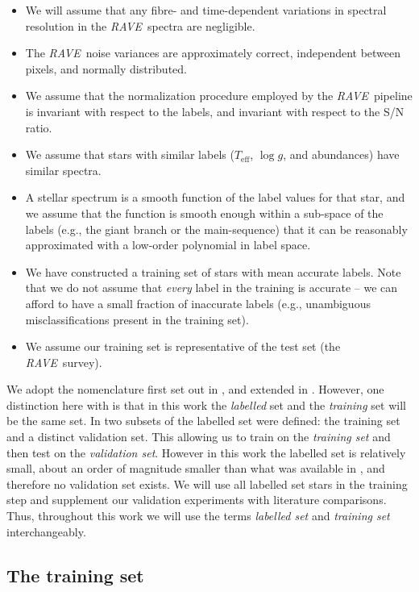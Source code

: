 \documentclass[preprint,trackchanges]{aastex}
\newcommand{\acronym}[1]{{\small{#1}}}
\newcommand{\project}[1]{\textsl{#1}}
\newcommand{\rave}{\project{\acronym{RAVE}}}
\newcommand{\teff}{T_{\mathrm{eff}}}
\newcommand{\logg}{\log g}
\begin{document}
\begin{itemize}
\item We will assume that any fibre- and time-dependent variations in spectral
resolution in the \rave\ spectra are negligible.
\item The \rave\ noise variances are approximately correct, independent between
pixels, and normally distributed.
\item We assume that the normalization procedure employed by the \rave\ pipeline
is invariant with respect to the labels, and invariant with respect to the S/N
ratio.
\item We assume that stars with similar labels ($\teff$, $\logg$, and abundances)
have similar spectra.
\item A stellar spectrum is a smooth function of the label values for that star,
and we assume that the function is smooth enough within a sub-space of the labels
(e.g., the giant branch or the main-sequence) that it can be reasonably approximated 
with a low-order polynomial in label space.
\item We have constructed a training set of stars with mean accurate labels.  Note
that we do not assume that \emph{every} label in the training is accurate -- we can
afford to have a small fraction of inaccurate labels (e.g., unambiguous misclassifications
present in the training set).
\item We assume our training set is representative of the test set (the \rave\ survey).
\end{itemize}


We adopt the nomenclature first set out in \citet{Ness_2015}, and extended in 
\citet{Casey_2016b}.  However, one distinction here with \citet{Casey_2016b} is 
that in this work the \emph{labelled} set and the \emph{training} set will be 
the same set.  In \citet{Casey_2016b} two subsets of the labelled set were 
defined: the training set and a distinct validation set.  This allowing us to 
train on the \emph{training set} and then test on the \emph{validation set}.  
However in this work the labelled set is relatively small, about an order of 
magnitude smaller than what was available in \citet{Casey_2016b}, and therefore 
no validation set exists. We will use all labelled set stars in the training 
step and supplement our validation experiments with literature comparisons.  
Thus, throughout this work we will use the terms \emph{labelled set} and 
\emph{training set} interchangeably. 


\subsection{The training set}
\label{sec:the-training-set}
\end{document}
